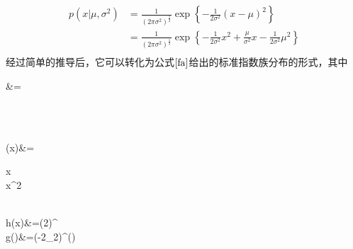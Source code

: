 \begin{enumerate}
\begin{equation}
\begin{aligned}
		p(x|\mu,\sigma^2)&=\frac{1}{(2\pi\sigma^2)^{\frac{1}{2}}}\exp\left\{-\frac{1}{2\sigma^2}(x-\mu)^2 \right\}\\
		&=\frac{1}{(2\pi\sigma^2)^{\frac{1}{2}}}\exp\left\{-\frac{1}{2\sigma^2}x^2+\frac{\mu}{\sigma^2}x-\frac{1}{2\sigma^2}\mu^2 \right\}\\
		\end{aligned}
	\end{equation}
	经过简单的推导后，它可以转化为公式$\ref{fa}$给出的标准指数族分布的形式，其中
	\begin{flalign}
		\eta&=\begin{pmatrix}
		\\
		\end{pmatrix}\\
		\mu(x)&=\begin{pmatrix}
		x\\x^2
		\end{pmatrix}\\
		h(x)&=(2\pi)^{}\\
		g(\eta)&=(-2\eta_2)^{}\exp\left(\right)
	\end{flalign}
\end{enumerate}
